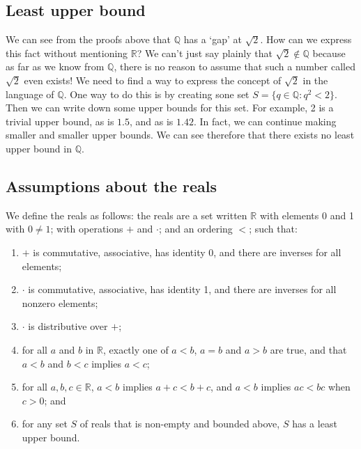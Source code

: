 \subsection{Least upper bound}
We can see from the proofs above that \(\mathbb Q\) has a `gap' at \(\sqrt 2\).
How can we express this fact without mentioning \(\mathbb R\)?
We can't just say plainly that \(\sqrt 2 \notin \mathbb Q\) because as far as we know from \(\mathbb Q\), there is no reason to assume that such a number called \(\sqrt 2\) even exists!
We need to find a way to express the concept of \(\sqrt 2\) in the language of \(\mathbb Q\).
One way to do this is by creating sone set \(S = \{ q \in \mathbb Q: q^2 < 2 \}\).
Then we can write down some upper bounds for this set.
For example, 2 is a trivial upper bound, as is \(1.5\), and as is \(1.42\).
In fact, we can continue making smaller and smaller upper bounds.
We can see therefore that there exists no least upper bound in \(\mathbb Q\).

\subsection{Assumptions about the reals}
We define the reals as follows: the reals are a set written \(\mathbb R\) with elements 0 and 1 with \(0 \neq 1\); with operations \(+\) and \(\cdot\); and an ordering \(<\); such that:
\begin{enumerate}
	\item \(+\) is commutative, associative, has identity 0, and there are inverses for all elements;
	\item \(\cdot\) is commutative, associative, has identity 1, and there are inverses for all nonzero elements;
	\item \(\cdot\) is distributive over \(+\);
	\item for all \(a\) and \(b\) in \(\mathbb R\), exactly one of \(a<b\), \(a=b\) and \(a>b\) are true, and that \(a<b\) and \(b<c\) implies \(a<c\);
	\item for all \(a, b, c \in \mathbb R\), \(a<b\) implies \(a + c < b + c\), and \(a<b\) implies \(ac < bc\) when \(c > 0\); and
	\item for any set \(S\) of reals that is non-empty and bounded above, \(S\) has a least upper bound.
\end{enumerate}

